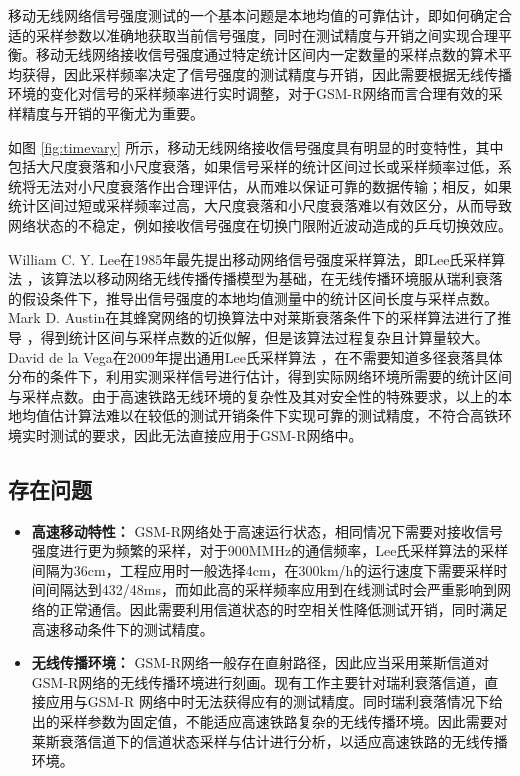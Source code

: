 移动无线网络信号强度测试的一个基本问题是本地均值的可靠估计，即如何确定合适的采样参数以准确地获取当前信号强度，同时在测试精度与开销之间实现合理平衡。移动无线网络接收信号强度通过特定统计区间内一定数量的采样点数的算术平均获得，因此采样频率决定了信号强度的测试精度与开销，因此需要根据无线传播环境的变化对信号的采样频率进行实时调整，对于GSM-R网络而言合理有效的采样精度与开销的平衡尤为重要。

如图 \ref{fig:timevary} 所示，移动无线网络接收信号强度具有明显的时变特性，其中包括大尺度衰落和小尺度衰落，如果信号采样的统计区间过长或采样频率过低，系统将无法对小尺度衰落作出合理评估，从而难以保证可靠的数据传输；相反，如果统计区间过短或采样频率过高，大尺度衰落和小尺度衰落难以有效区分，从而导致网络状态的不稳定，例如接收信号强度在切换门限附近波动造成的乒乓切换效应。

William C. Y. Lee在1985年最先提出移动网络信号强度采样算法，即Lee氏采样算法 \cite{lee1985estimate}，该算法以移动网络无线传播传播模型为基础，在无线传播环境服从瑞利衰落的假设条件下，推导出信号强度的本地均值测量中的统计区间长度与采样点数。Mark D. Austin在其蜂窝网络的切换算法中对莱斯衰落条件下的采样算法进行了推导 \cite{Austin1994}，得到统计区间与采样点数的近似解，但是该算法过程复杂且计算量较大。David de la Vega在2009年提出通用Lee氏采样算法 \cite{Vega2009}，在不需要知道多径衰落具体分布的条件下，利用实测采样信号进行估计，得到实际网络环境所需要的统计区间与采样点数。由于高速铁路无线环境的复杂性及其对安全性的特殊要求，以上的本地均值估计算法难以在较低的测试开销条件下实现可靠的测试精度，不符合高铁环境实时测试的要求，因此无法直接应用于GSM-R网络中。

\subsection{存在问题}
\label{sec:prob3}

\begin{itemize}
  \item \textbf{高速移动特性：}
  GSM-R网络处于高速运行状态，相同情况下需要对接收信号强度进行更为频繁的采样，对于900MMHz的通信频率，Lee氏采样算法的采样间隔为36cm，工程应用时一般选择4cm，在300km/h的运行速度下需要采样时间间隔达到432/48ms，而如此高的采样频率应用到在线测试时会严重影响到网络的正常通信。因此需要利用信道状态的时空相关性降低测试开销，同时满足高速移动条件下的测试精度。
  \item \textbf{无线传播环境：}
  GSM-R网络一般存在直射路径，因此应当采用莱斯信道对GSM-R网络的无线传播环境进行刻画。现有工作主要针对瑞利衰落信道，直接应用与GSM-R 网络中时无法获得应有的测试精度。同时瑞利衰落情况下给出的采样参数为固定值，不能适应高速铁路复杂的无线传播环境。因此需要对莱斯衰落信道下的信道状态采样与估计进行分析，以适应高速铁路的无线传播环境。
\end{itemize}

